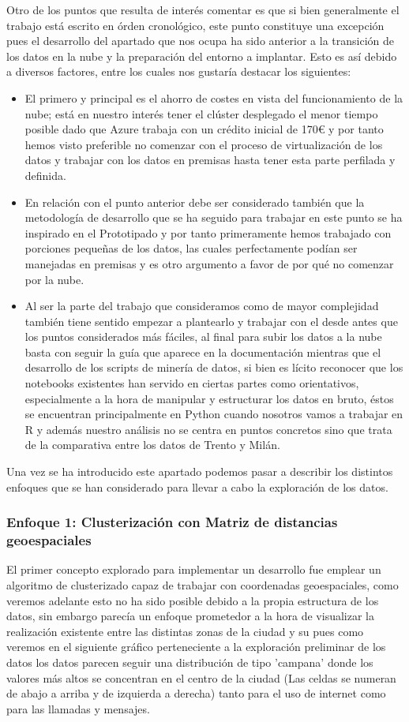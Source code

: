\documentclass[11pt, a4paper]{article} %
\begin{document}
Otro de los puntos que resulta de interés comentar es que si bien generalmente el trabajo está escrito en órden cronológico, este punto constituye una excepción pues el desarrollo del apartado que nos ocupa ha sido anterior a la transición de los datos en la nube y la preparación del entorno a implantar. Esto es así debido a diversos factores, entre los cuales nos gustaría destacar los siguientes:
\begin{itemize}
\item El primero y principal es el ahorro de costes en vista del funcionamiento de la nube; está en nuestro interés tener el clúster desplegado el menor tiempo posible dado que Azure trabaja con un crédito inicial de 170€ y por tanto hemos visto preferible no comenzar con el proceso de virtualización de los datos y trabajar con los datos en premisas hasta tener esta parte perfilada y definida.
\item En relación con el punto anterior debe ser considerado también que la metodología de desarrollo que se ha seguido para trabajar en este punto se ha inspirado en el Prototipado y por tanto primeramente hemos trabajado con porciones pequeñas de los datos, las cuales perfectamente podían ser manejadas en premisas y es otro argumento a favor de por qué no comenzar por la nube.
\item Al ser la parte del trabajo que consideramos como de mayor complejidad también tiene sentido empezar a plantearlo y trabajar con el desde antes que los puntos considerados más fáciles, al final para subir los datos a la nube basta con seguir la guía que aparece en la documentación mientras que el desarrollo de los scripts de minería de datos, si bien es lícito reconocer que los notebooks existentes han servido en ciertas partes como orientativos, especialmente a la hora de manipular y estructurar los datos en bruto, éstos se encuentran principalmente en Python cuando nosotros vamos a trabajar en R y además nuestro análisis no se centra en puntos concretos sino que trata de la comparativa entre los datos de Trento y Milán. \cite{docazureregR1} \cite{italia}
\end{itemize}
Una vez se ha introducido este apartado podemos pasar a describir los distintos enfoques que se han considerado para llevar a cabo la exploración de los datos.
\subsubsection{Enfoque 1: Clusterización con Matriz de distancias geoespaciales}
El primer concepto explorado para implementar un desarrollo fue emplear un algoritmo de clusterizado capaz de trabajar con coordenadas geoespaciales, como veremos adelante esto no ha sido posible debido a la propia estructura de los datos, sin embargo parecía un enfoque prometedor a la hora de visualizar la realización existente entre las distintas zonas de la ciudad y su pues como veremos en el siguiente gráfico perteneciente a la exploración preliminar de los datos los datos parecen seguir una distribución de tipo 'campana' donde los valores más altos se concentran en el centro de la ciudad (Las celdas se numeran de abajo a arriba y de izquierda a derecha) tanto para el uso de internet como para las llamadas y mensajes.
\end{document}
